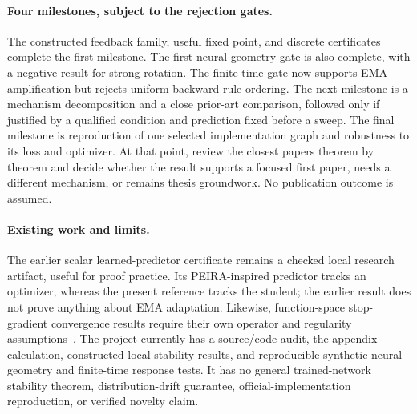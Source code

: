 \documentclass[11pt,a4paper]{article}
\begin{document}
\paragraph{Four milestones, subject to the rejection gates.}
The constructed feedback family, useful fixed point, and discrete
certificates complete the first milestone. The first neural geometry gate
is also complete, with a negative result for strong rotation. The finite-time
gate now supports EMA amplification but rejects uniform backward-rule
ordering. The next milestone is a mechanism decomposition and a close
prior-art comparison, followed only if justified by a qualified condition
and prediction fixed before a sweep. The final milestone is reproduction of one
selected implementation graph and robustness to its loss and optimizer.
At that point, review the closest
papers theorem by theorem and decide whether the result supports a focused
first paper, needs a different mechanism, or remains thesis groundwork.
No publication outcome is assumed.

\paragraph{Existing work and limits.}
The earlier scalar learned-predictor certificate remains a checked local
research artifact, useful for proof practice. Its PEIRA-inspired predictor
tracks an optimizer, whereas the present reference tracks the student;
the earlier result does not prove anything about EMA adaptation. Likewise,
function-space stop-gradient convergence results require their own operator
and regularity assumptions~\cite{stopgrads}. The project currently has a source/code audit, the appendix calculation,
constructed local stability results, and reproducible synthetic neural
geometry and finite-time response tests. It has no general trained-network stability theorem,
distribution-drift guarantee, official-implementation reproduction,
or verified novelty claim.

\medskip
{}

\appendix
\end{document}
